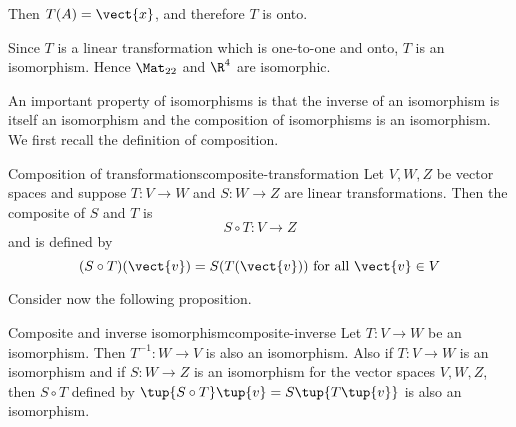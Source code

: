 \begin{solution}
Then $T(A)=\vect{x}$, and therefore $T$ is onto.

Since $T$ is a linear transformation which is one-to-one and onto, $T$ is an isomorphism. Hence $\Mat_{22}$ and $\R^4$ are isomorphic.
\end{solution}

An important property of isomorphisms is that the inverse of an isomorphism
is itself an isomorphism and the composition of isomorphisms is an
isomorphism. We first recall the definition of composition.

\begin{definition}{Composition of transformations}{composite-transformation}
Let $V, W, Z$ be vector spaces and suppose $T: V \to W$ and $S: W \to Z$ are linear transformations. Then the composite of $S$ and $T$ is
\[
S \circ T: V \to Z
\]
and is defined by 
\[
(S \circ T) (\vect{v}) = S(T(\vect{v})) \mbox{ for all } \vect{v} \in V
\]
\end{definition}

Consider now the following proposition.

\begin{proposition}{Composite and inverse isomorphism}{composite-inverse}
Let $T:V\rightarrow W$ be an isomorphism. Then $T^{-1}:W\rightarrow V$ is
also an isomorphism. Also if $T:V\rightarrow W$ is an isomorphism and if $
S:W\rightarrow Z$ is an isomorphism for the vector spaces $V,W,Z$, then $
S\circ T$ defined by $\tup{S\circ T} \tup{v} = S\tup{
T\tup{v} } $ is also an isomorphism.
\end{proposition}

